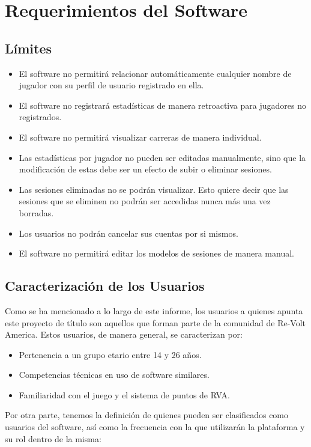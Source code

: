 \chapter{Requerimientos del Software}

\section{Límites}

\begin{itemize}
	\item El software no permitirá relacionar automáticamente cualquier nombre de jugador con su perfil de usuario registrado en ella.
	\item El software no registrará estadísticas de manera retroactiva para jugadores no registrados.
	\item El software no permitirá visualizar carreras de manera individual.
	\item Las estadísticas por jugador no pueden ser editadas manualmente, sino que la modificación de estas debe ser un efecto de subir o eliminar sesiones.
	\item Las sesiones eliminadas no se podrán visualizar. Esto quiere decir que las sesiones que se eliminen no podrán ser accedidas nunca más una vez borradas.
	\item Los usuarios no podrán cancelar sus cuentas por si mismos.
	\item El software no permitirá editar los modelos de sesiones de manera manual.
\end{itemize}

\section{Caracterización de los Usuarios}
Como se ha mencionado a lo largo de este informe, los usuarios a quienes apunta este proyecto de título son aquellos que forman parte de la comunidad de Re-Volt America. Estos usuarios, de manera general, se caracterizan por:

\begin{itemize}
	\item Pertenencia a un grupo etario entre 14 y 26 años.
	\item Competencias técnicas en uso de software similares.
	\item Familiaridad con el juego y el sistema  de puntos de RVA.
\end{itemize}

Por otra parte, tenemos la definición de quienes pueden ser clasificados como usuarios del software, así como la frecuencia con la que utilizarán la plataforma y su rol dentro de la misma:

